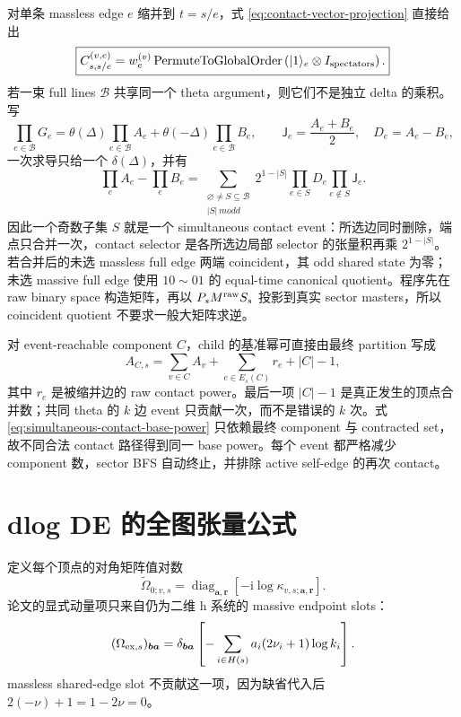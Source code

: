 \documentclass[11pt,a4paper]{ctexart}
\newcommand{\ii}{\mathrm i}
\begin{document}
对单条 massless edge $e$ 缩并到 $t=s/e$，式 \eqref{eq:contact-vector-projection} 直接给出
\begin{equation}
 \boxed{
 C_{s,s/e}^{(v,e)}
 =w_e^{(v)}
 \operatorname{PermuteToGlobalOrder}
 \left(|1\rangle_e\otimes I_{\rm spectators}\right).
 }
 \label{eq:contact-injection}
\end{equation}
若一束 full lines $\mathcal B$ 共享同一个 theta argument，则它们不是独立 delta 的乘积。写
\begin{equation}
 \prod_{e\in\mathcal B}G_e
 =\theta(\Delta)\prod_{e\in\mathcal B}A_e
 +\theta(-\Delta)\prod_{e\in\mathcal B}B_e,
 \qquad
 \mathsf J_e=\frac{A_e+B_e}{2},\quad D_e=A_e-B_e,
\end{equation}
一次求导只给一个 $\delta(\Delta)$，并有
\begin{equation}
 \prod_eA_e-\prod_eB_e
 =\sum_{\substack{\varnothing\neq S\subseteq\mathcal B\\|S|\ {m odd}}}
 2^{1-|S|}\prod_{e\in S}D_e\prod_{e\notin S}\mathsf J_e.
 \label{eq:common-theta-odd-subsets}
\end{equation}
因此一个奇数子集 $S$ 就是一个 simultaneous contact event：所选边同时删除，端点只合并一次，contact selector 是各所选边局部 selector 的张量积再乘 $2^{1-|S|}$。若合并后的未选 massless full edge 两端 coincident，其 odd shared state 为零；未选 massive full edge 使用 $10\sim01$ 的 equal-time canonical quotient。程序先在 raw binary space 构造矩阵，再以 $P_sM^{\rm raw}S_s$ 投影到真实 sector masters，所以 coincident quotient 不要求一般大矩阵求逆。

对 event-reachable component $C$，child 的基准幂可直接由最终 partition 写成
\begin{equation}
 A_{C,s}=\sum_{v\in C}A_v
 +\sum_{e\in E_s(C)}r_e+|C|-1,
 \label{eq:simultaneous-contact-base-power}
\end{equation}
其中 $r_e$ 是被缩并边的 raw contact power。最后一项 $|C|-1$ 是真正发生的顶点合并数；共同 theta 的 $k$ 边 event 只贡献一次，而不是错误的 $k$ 次。式 \eqref{eq:simultaneous-contact-base-power} 只依赖最终 component 与 contracted set，故不同合法 contact 路径得到同一 base power。每个 event 都严格减少 component 数，sector BFS 自动终止，并排除 active self-edge 的再次 contact。

\section{dlog DE 的全图张量公式}

定义每个顶点的对角矩阵值对数
\begin{equation}
 \widetilde\Omega_{0;v,s}
 =\operatorname{diag}_{\bm a,\bm r}
 \left[-\ii\log\kappa_{v,s;\bm a,\bm r}\right].
 \label{eq:global-omega0}
\end{equation}
论文的显式动量项只来自仍为二维 h 系统的 massive endpoint slots：
\begin{equation}
 (\Omega_{{\rm ex},s})_{\bm b\bm a}
 =\delta_{\bm b\bm a}
 \left[-\sum_{i\in H(s)}a_i(2\nu_i+1)\log k_i\right].
 \label{eq:global-omega-ex}
\end{equation}
massless shared-edge slot 不贡献这一项，因为缺省代入后 $2(-\nu)+1=1-2\nu=0$。
\end{document}
